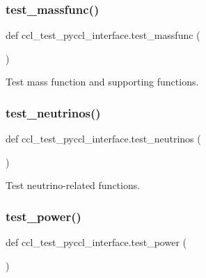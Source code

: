 \subsubsection{\texorpdfstring{test\+\_\+massfunc()}{test\_massfunc()}}
{\footnotesize\ttfamily def ccl\+\_\+test\+\_\+pyccl\+\_\+interface.\+test\+\_\+massfunc (\begin{DoxyParamCaption}{ }\end{DoxyParamCaption})}

\begin{DoxyVerb}Test mass function and supporting functions.
\end{DoxyVerb}
 \mbox{\label{namespaceccl__test__pyccl__interface_ae4c580c07c1b1ff62524d160ea8d6756}} 
\subsubsection{\texorpdfstring{test\+\_\+neutrinos()}{test\_neutrinos()}}
{\footnotesize\ttfamily def ccl\+\_\+test\+\_\+pyccl\+\_\+interface.\+test\+\_\+neutrinos (\begin{DoxyParamCaption}{ }\end{DoxyParamCaption})}

\begin{DoxyVerb}Test neutrino-related functions.
\end{DoxyVerb}
 \mbox{\label{namespaceccl__test__pyccl__interface_aa0fa1e5e5f099cfa4e0c55e8cc80f585}} 
\subsubsection{\texorpdfstring{test\+\_\+power()}{test\_power()}}
{\footnotesize\ttfamily def ccl\+\_\+test\+\_\+pyccl\+\_\+interface.\+test\+\_\+power (\begin{DoxyParamCaption}{ }\end{DoxyParamCaption})}

